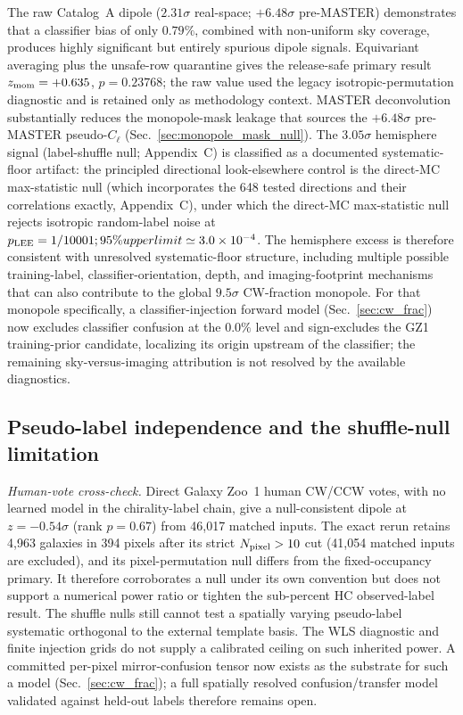 \documentclass[twocolumn,linenumbers]{aastex702}
\newcommand{\sigmaunit}{\sigma}
\begin{document}
The raw Catalog~A dipole ($2.31\sigmaunit$ real-space; $+6.48\sigmaunit$ pre-MASTER) demonstrates that a classifier bias of only $0.79\%$, combined with non-uniform sky coverage, produces highly significant but entirely spurious dipole signals. Equivariant averaging plus the unsafe-row quarantine gives the release-safe primary result $z_{\rm mom}=+0.635$, $p=0.23768$; the raw value used the legacy isotropic-permutation diagnostic and is retained only as methodology context. MASTER deconvolution substantially reduces the monopole-mask leakage that sources the $+6.48\sigmaunit$ pre-MASTER pseudo-$C_\ell$ (Sec.~\ref{sec:monopole_mask_null}). The $3.05\sigmaunit$ hemisphere signal (label-shuffle null; Appendix~C) is classified as a documented systematic-floor artifact: the principled directional look-elsewhere control is the direct-MC max-statistic null (which incorporates the 648 tested directions and their correlations exactly, Appendix~C), under which the direct-MC max-statistic null rejects isotropic random-label noise at $p_{\rm LEE}=1/10001; 95\% upper limit \simeq3.0\times10^{-4}$. The hemisphere excess is therefore consistent with unresolved systematic-floor structure, including multiple possible training-label, classifier-orientation, depth, and imaging-footprint mechanisms that can also contribute to the global $9.5\sigmaunit$ CW-fraction monopole. For that monopole specifically, a classifier-injection forward model (Sec.~\ref{sec:cw_frac}) now excludes classifier confusion at the $0.0\%$ level and sign-excludes the GZ1 training-prior candidate, localizing its origin upstream of the classifier; the remaining sky-versus-imaging attribution is not resolved by the available diagnostics.

\subsection{Pseudo-label independence and the shuffle-null limitation}
\label{sec:pseudolabel_independence}

\emph{Human-vote cross-check.} Direct Galaxy Zoo~1 human CW/CCW votes, with no learned model in the chirality-label chain, give a null-consistent dipole at $z=-0.54\sigmaunit$ (rank $p=0.67$) from 46,017 matched inputs. The exact rerun retains 4,963 galaxies in 394 pixels after its strict $N_{\rm pixel}>10$ cut (41,054 matched inputs are excluded), and its pixel-permutation null differs from the fixed-occupancy primary. It therefore corroborates a null under its own convention but does not support a numerical power ratio or tighten the sub-percent HC observed-label result. The shuffle nulls still cannot test a spatially varying pseudo-label systematic orthogonal to the external template basis. The WLS diagnostic and finite injection grids do not supply a calibrated ceiling on such inherited power. A committed per-pixel mirror-confusion tensor now exists as the substrate for such a model (Sec.~\ref{sec:cw_frac}); a full spatially resolved confusion/transfer model validated against held-out labels therefore remains open.
\end{document}
